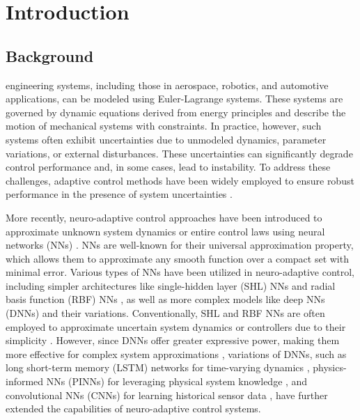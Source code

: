 \documentclass[journal]{IEEEtran}
\begin{document}
\section{Introduction}

\subsection{Background}

 engineering systems, including those in aerospace, robotics, and automotive applications, can be modeled using Euler-Lagrange systems. 
These systems are governed by dynamic equations derived from energy principles and describe the motion of mechanical systems with constraints. 
In practice, however, such systems often exhibit uncertainties due to unmodeled dynamics, parameter variations, or external disturbances. 
These uncertainties can significantly degrade control performance and, in some cases, lead to instability. 
To address these challenges, adaptive control methods have been widely employed to ensure robust performance in the presence of system uncertainties \cite{Ioannou:2006aa, Tao:2003aa}.

More recently, neuro-adaptive control approaches have been introduced to approximate unknown system dynamics or entire control laws using neural networks (NNs) \cite{Lewis:1998aa,Farrell:2006aa}. 
NNs are well-known for their universal approximation property, which allows them to approximate any smooth function over a compact set with minimal error. 
Various types of NNs have been utilized in neuro-adaptive control, including simpler architectures like single-hidden layer (SHL) NNs \cite{Ge:2010aa, Yesildirek:1995aa} and radial basis function (RBF) NNs \cite{Liu:2013ab,Ge:2002aa}, as well as more complex models like deep NNs (DNNs) \cite{Patil:2022aa} and their variations. 
Conventionally, SHL and RBF NNs are often employed to approximate uncertain system dynamics or controllers due to their simplicity \cite{Esfandiari:2014aa,Esfandiari:2015aa,Yesildirek:1995aa,Gao:2006aa}.
However, since DNNs offer greater expressive power, making them more effective for complex system approximations \cite{Rolnick:2018aa}, variations of DNNs, such as long short-term memory (LSTM) networks for time-varying dynamics \cite{Griffis:2023aa}, physics-informed NNs (PINNs) for leveraging physical system knowledge \cite{Hart:2024aa}, and convolutional NNs (CNNs) for learning historical sensor data \cite{Ryu:2024ac}, have further extended the capabilities of neuro-adaptive control systems.
\end{document}

